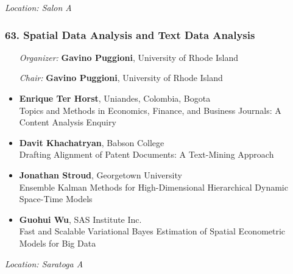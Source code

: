 \emph{Location: Salon A}

\subsubsection*{63. Spatial Data Analysis and Text Data Analysis}

\begin{enumerate}[align=left]
\item [\emph{Organizer:}] \textbf{Gavino Puggioni}, University of Rhode Island
\item [\emph{Chair:}] \textbf{Gavino Puggioni}, University of Rhode Island
\end{enumerate}

\begin{itemize}
\item \textbf{Enrique Ter Horst}, Uniandes, Colombia, Bogota \\
Topics and Methods in Economics, Finance, and Business Journals: A Content Analysis Enquiry
\item \textbf{Davit Khachatryan}, Babson College \\
Drafting Alignment of Patent Documents: A Text-Mining Approach
\item \textbf{Jonathan Stroud}, Georgetown University \\
Ensemble Kalman Methods for High-Dimensional Hierarchical Dynamic Space-Time Models
\item \textbf{Guohui Wu}, SAS Institute Inc. \\
Fast and Scalable Variational Bayes Estimation of Spatial Econometric Models for Big Data
\end{itemize}

\emph{Location: Saratoga A}

